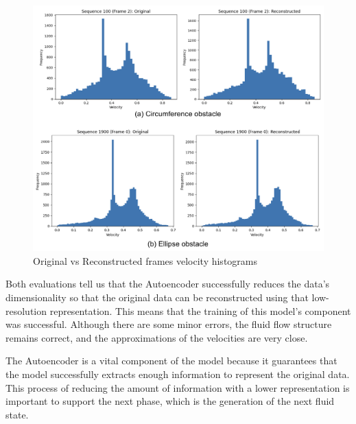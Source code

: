 
\begin{figure}[H]
    \centering
    \includegraphics[width=1\linewidth]{images/autoencoder_histogram.png}
    \caption{Original vs Reconstructed frames velocity histograms}
    \label{fig:ReconstructedHistograms}
\end{figure}

Both evaluations tell us that the Autoencoder successfully reduces the data's dimensionality so that the original data can be reconstructed using that low-resolution representation. This means that the training of this model's component was successful. Although there are some minor errors, the fluid flow structure remains correct, and the approximations of the velocities are very close.

The Autoencoder is a vital component of the model because it guarantees that the model successfully extracts enough information to represent the original data. This process of reducing the amount of information with a lower representation is important to support the next phase, which is the generation of the next fluid state.


